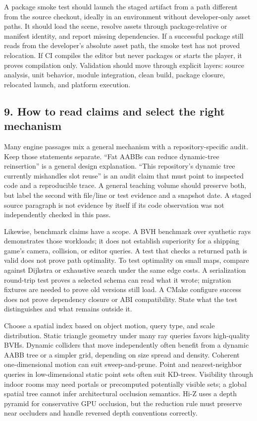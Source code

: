 A package smoke test should launch the staged artifact from a path different from the source checkout, ideally in an environment without developer-only asset paths. It should load the scene, resolve assets through package-relative or manifest identity, and report missing dependencies. If a successful package still reads from the developer's absolute asset path, the smoke test has not proved relocation. If CI compiles the editor but never packages or starts the player, it proves compilation only. Validation should move through explicit layers: source analysis, unit behavior, module integration, clean build, package closure, relocated launch, and platform execution.

\subsection{9. How to read claims and select the right mechanism}\label{05-engine-i-ch008-how-to-read-claims-and-select-the-right-mechanism}

Many engine passages mix a general mechanism with a repository-specific audit. Keep those statements separate. ``Fat AABBs can reduce dynamic-tree reinsertion'' is a general design explanation. ``This repository's dynamic tree currently mishandles slot reuse'' is an audit claim that must point to inspected code and a reproducible trace. A general teaching volume should preserve both, but label the second with file/line or test evidence and a snapshot date. A staged source paragraph is not evidence by itself if its code observation was not independently checked in this pass.

Likewise, benchmark claims have a scope. A BVH benchmark over synthetic rays demonstrates those workloads; it does not establish superiority for a shipping game's camera, collision, or editor queries. A test that checks a returned path is valid does not prove path optimality. To test optimality on small maps, compare against Dijkstra or exhaustive search under the same edge costs. A serialization round-trip test proves a selected schema can read what it wrote; migration fixtures are needed to prove old versions still load. A CMake configure success does not prove dependency closure or ABI compatibility. State what the test distinguishes and what remains outside it.

Choose a spatial index based on object motion, query type, and scale distribution. Static triangle geometry under many ray queries favors high-quality BVHs. Dynamic colliders that move independently often benefit from a dynamic AABB tree or a simpler grid, depending on size spread and density. Coherent one-dimensional motion can suit sweep-and-prune. Point and nearest-neighbor queries in low-dimensional static point sets often suit KD-trees. Visibility through indoor rooms may need portals or precomputed potentially visible sets; a global spatial tree cannot infer architectural occlusion semantics. Hi-Z uses a depth pyramid for conservative GPU occlusion, but the reduction rule must preserve near occluders and handle reversed depth conventions correctly.

